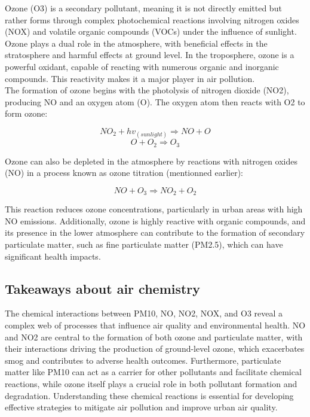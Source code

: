 \documentclass{modeleRapport}
\begin{document}
Ozone (O3) is a secondary pollutant, meaning it is not directly emitted but rather forms through complex photochemical 
reactions involving nitrogen oxides (NOX) and volatile organic compounds (VOCs) under the influence of sunlight. Ozone 
plays a dual role in the atmosphere, with beneficial effects in the stratosphere and harmful effects at ground level. In the 
troposphere, ozone is a powerful oxidant, capable of reacting with numerous organic and inorganic compounds. This reactivity 
makes it a major player in air pollution.\\

The formation of ozone begins with the photolysis of nitrogen dioxide (NO2), producing NO and an oxygen atom (O). The 
oxygen atom then reacts with O2 to form ozone:

$$NO_2 + hv_{(sunlight)} \Rightarrow NO+O$$
$$O+O_2 \Rightarrow O_3$$

Ozone can also be depleted in the atmosphere by reactions with nitrogen oxides (NO) in a process known as ozone titration
(mentionned earlier):

$$NO + O_3 \Rightarrow NO_2 + O_2$$

This reaction reduces ozone concentrations, particularly in urban areas with high NO emissions. Additionally, ozone is 
highly reactive with organic compounds, and its presence in the lower atmosphere can contribute to the formation of 
secondary particulate matter, such as fine particulate matter (PM2.5), which can have significant health impacts.

\subsection{Takeaways about air chemistry}

The chemical interactions between PM10, NO, NO2, NOX, and O3 reveal a complex web of processes that influence air 
quality and environmental health. NO and NO2 are central to the formation of both ozone and particulate matter, with their 
interactions driving the production of ground-level ozone, which exacerbates smog and contributes to adverse health outcomes. 
Furthermore, particulate matter like PM10 can act as a carrier for other pollutants and facilitate chemical reactions, while 
ozone itself plays a crucial role in both pollutant formation and degradation. Understanding these chemical reactions is 
essential for developing effective strategies to mitigate air pollution and improve urban air quality.

\newpage
\end{document}

